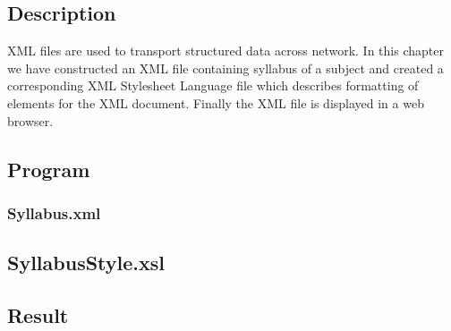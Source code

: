 \subsection{Description}
XML files are used to transport structured data across network. In this chapter we have constructed an XML file containing syllabus of a subject and created a corresponding XML Stylesheet Language  file which describes formatting of elements for the XML document. Finally the XML file is displayed in a web browser.
\subsection{Program}
\subsubsection{Syllabus.xml}
\subsection{SyllabusStyle.xsl}

\subsection{Result}\result
